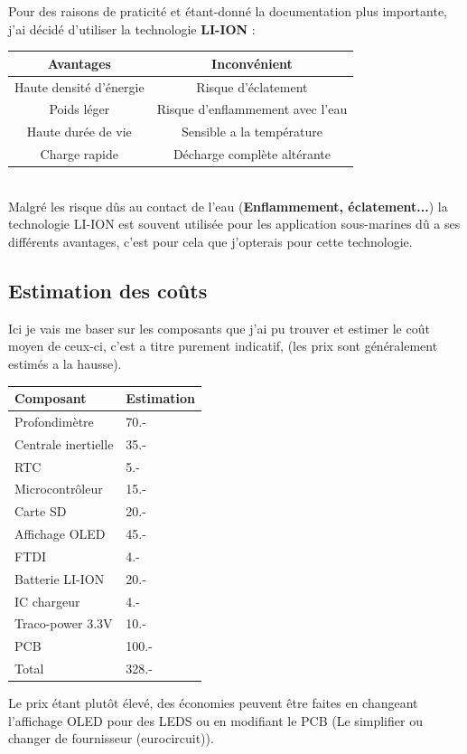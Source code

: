 {{Pour des raisons de praticité et étant-donné la documentation plus importante, j'ai décidé d'utiliser la technologie \textbf{LI-ION} : \\

\centering
\begin{tabular}{c|c}
    Avantages &  Inconvénient\\
    \hline
    Haute densité d'énergie & Risque d'éclatement \\
    Poids léger & Risque d'enflammement avec l'eau \\ 
    Haute durée de vie & Sensible a la température \\
    Charge rapide & Décharge complète altérante \\
\end{tabular}
\vspace{+8pt}
\\ Malgré les risque dûs au contact de l'eau (\textbf{Enflammement, éclatement...}) la technologie LI-ION est souvent utilisée pour les application sous-marines dû a ses différents avantages, c'est pour cela que j'opterais pour cette technologie. 

}

}

\newpage
\subsection{Estimation des coûts} \label{ssec:EstPrix}
{
    Ici je vais me baser sur les composants que j'ai pu trouver et estimer le coût moyen de ceux-ci, c'est a titre purement indicatif, (les prix sont généralement estimés a la hausse).
    \vspace{+12pt}
    
    \begin{center}
        \begin{tabular}{l|l}
            Composant & Estimation \\
            \hline
            Profondimètre & 70.- \\
            Centrale inertielle & 35.- \\
            RTC & 5.- \\
            Microcontrôleur & 15.- \\
            Carte SD & 20.- \\
            Affichage OLED & 45.- \\
            FTDI & 4.- \\
            Batterie LI-ION & 20.- \\
            IC chargeur & 4.- \\
            Traco-power 3.3V & 10.- \\
            PCB & 100.- \\
            \hline
            \hline
            Total & 328.-
        \end{tabular} 
    \end{center}
	

    Le prix étant plutôt élevé, des économies peuvent être faites en changeant l'affichage OLED pour des LEDS ou en modifiant le PCB (Le simplifier ou changer de fournisseur (eurocircuit)).

}

